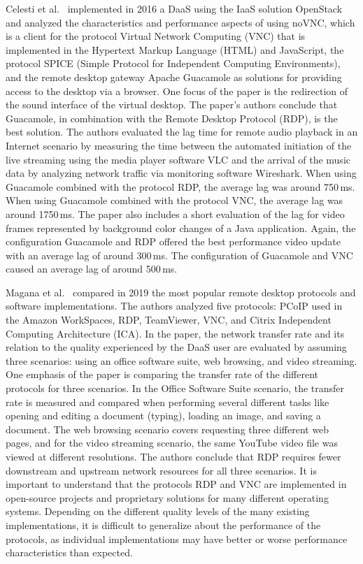 \documentclass[runningheads]{llncs}
\begin{document}
Celesti et al.~\cite{celesti2016improving} implemented in 2016 a DaaS using the IaaS solution OpenStack~\cite{sefraoui2012openstack} and analyzed the characteristics and performance aspects of using noVNC, which is a client for the protocol Virtual Network Computing (VNC) that is implemented in the Hypertext Markup Language (HTML) and JavaScript, the protocol SPICE (Simple Protocol for Independent Computing Environments), and the remote desktop gateway Apache Guacamole as solutions for providing access to the desktop via a browser. One focus of the paper is the redirection of the sound interface of the virtual desktop. The paper's authors conclude that Guacamole, in combination with the Remote Desktop Protocol (RDP), is the best solution. The authors evaluated the lag time for remote audio playback in an Internet scenario by measuring the time between the automated initiation of the live streaming using the media player software VLC and the arrival of the music data by analyzing network traffic via monitoring software Wireshark. When using Guacamole combined with the protocol RDP, the average lag was around 750\,ms. When using Guacamole combined with the protocol VNC, the average lag was around 1750\,ms. The paper also includes a short evaluation of the lag for video frames represented by background color changes of a Java application. Again, the configuration Guacamole and RDP offered the best performance video update with an average lag of around 300\,ms. The configuration of Guacamole and VNC caused an average lag of around 500\,ms.

Magana et al.~\cite{magana2019remote} compared in 2019 the most popular remote desktop protocols and software implementations. The authors analyzed five protocols: PCoIP used in the Amazon WorkSpaces, RDP, TeamViewer, VNC, and Citrix Independent Computing Architecture (ICA). In the paper, the network transfer rate and its relation to the quality experienced by the DaaS user are evaluated by assuming three scenarios: using an office software suite, web browsing, and video streaming. One emphasis of the paper is comparing the transfer rate of the different protocols for three scenarios. In the Office Software Suite scenario, the transfer rate is measured and compared when performing several different tasks like opening and editing a document (typing), loading an image, and saving a document. The web browsing scenario covers requesting three different web pages, and for the video streaming scenario, the same YouTube video file was viewed at different resolutions. The authors conclude that RDP requires fewer downstream and upstream network resources for all three scenarios. It is important to understand that the protocols RDP and VNC are implemented in open-source projects and proprietary solutions for many different operating systems. Depending on the different quality levels of the many existing implementations, it is difficult to generalize about the performance of the protocols, as individual implementations may have better or worse performance characteristics than expected.
\end{document}
